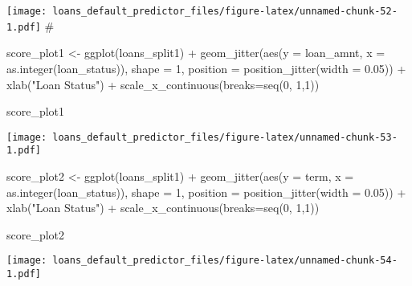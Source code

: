 \documentclass[
]{article}
\newenvironment{Shaded}{\begin{snugshade}}{\end{snugshade}}
\newcommand{\AttributeTok}[1]{\textcolor[rgb]{0.77,0.63,0.00}{#1}}
\newcommand{\DecValTok}[1]{\textcolor[rgb]{0.00,0.00,0.81}{#1}}
\newcommand{\FloatTok}[1]{\textcolor[rgb]{0.00,0.00,0.81}{#1}}
\newcommand{\FunctionTok}[1]{\textcolor[rgb]{0.00,0.00,0.00}{#1}}
\newcommand{\NormalTok}[1]{#1}
\newcommand{\OtherTok}[1]{\textcolor[rgb]{0.56,0.35,0.01}{#1}}
\newcommand{\SpecialCharTok}[1]{\textcolor[rgb]{0.00,0.00,0.00}{#1}}
\newcommand{\StringTok}[1]{\textcolor[rgb]{0.31,0.60,0.02}{#1}}
\begin{document}
\texttt{[image: loans\_default\_predictor\_files/figure-latex/unnamed-chunk-52-1.pdf]}
\#

\begin{Shaded}
\begin{Highlighting}[]
\NormalTok{score\_plot1 }\OtherTok{\textless{}{-}} \FunctionTok{ggplot}\NormalTok{(loans\_split1) }\SpecialCharTok{+}
  \FunctionTok{geom\_jitter}\NormalTok{(}\FunctionTok{aes}\NormalTok{(}\AttributeTok{y =}\NormalTok{ loan\_amnt, }\AttributeTok{x =} \FunctionTok{as.integer}\NormalTok{(loan\_status)), }\AttributeTok{shape =} \DecValTok{1}\NormalTok{, }
              \AttributeTok{position =} \FunctionTok{position\_jitter}\NormalTok{(}\AttributeTok{width =} \FloatTok{0.05}\NormalTok{)) }\SpecialCharTok{+} 
  \FunctionTok{xlab}\NormalTok{(}\StringTok{"Loan Status"}\NormalTok{) }\SpecialCharTok{+} \FunctionTok{scale\_x\_continuous}\NormalTok{(}\AttributeTok{breaks=}\FunctionTok{seq}\NormalTok{(}\DecValTok{0}\NormalTok{, }\DecValTok{1}\NormalTok{,}\DecValTok{1}\NormalTok{))}

\NormalTok{score\_plot1}
\end{Highlighting}
\end{Shaded}

\texttt{[image: loans\_default\_predictor\_files/figure-latex/unnamed-chunk-53-1.pdf]}

\begin{Shaded}
\begin{Highlighting}[]
\NormalTok{score\_plot2 }\OtherTok{\textless{}{-}} \FunctionTok{ggplot}\NormalTok{(loans\_split1) }\SpecialCharTok{+}
  \FunctionTok{geom\_jitter}\NormalTok{(}\FunctionTok{aes}\NormalTok{(}\AttributeTok{y =}\NormalTok{ term, }\AttributeTok{x =} \FunctionTok{as.integer}\NormalTok{(loan\_status)), }\AttributeTok{shape =} \DecValTok{1}\NormalTok{, }
              \AttributeTok{position =} \FunctionTok{position\_jitter}\NormalTok{(}\AttributeTok{width =} \FloatTok{0.05}\NormalTok{)) }\SpecialCharTok{+} 
  \FunctionTok{xlab}\NormalTok{(}\StringTok{"Loan Status"}\NormalTok{) }\SpecialCharTok{+} \FunctionTok{scale\_x\_continuous}\NormalTok{(}\AttributeTok{breaks=}\FunctionTok{seq}\NormalTok{(}\DecValTok{0}\NormalTok{, }\DecValTok{1}\NormalTok{,}\DecValTok{1}\NormalTok{))}

\NormalTok{score\_plot2}
\end{Highlighting}
\end{Shaded}

\texttt{[image: loans\_default\_predictor\_files/figure-latex/unnamed-chunk-54-1.pdf]}
\end{document}
